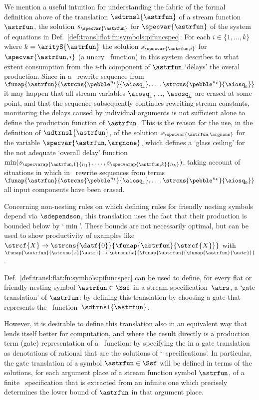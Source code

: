 We mention a useful intuition for understanding the fabric of 
the formal definition above of the translation $\sdtrnsl{\astrfun}$ 
of a stream function $\astrfun$,
the solution $s_{\specvar{\astrfun}}$ for $\specvar{\astrfun}$
of the system of equations in Def.~\ref{def:transl:flat:fn:symbols:pifuncspec}. 
For each $i\in\{1,\ldots,k\}$ where $k = \arityS{\astrfun}$
the solution $s_{\specvar{\astrfun,i}}$ for $\specvar{\astrfun,i}$
(a unary \pein~function) in this system
describes to what extent consumption from the $i$-th component of $\astrfun$
`delays' the overal production.
Since in a \daob~rewrite sequence from
$\funap{\astrfun}{\strcns{\pebble^{n_1}}{\aiosq_1}, \ldots, \strcns{\pebble^{n_k}}{\aiosq_k}}$
it may happen that all stream variables $\aiosq_1$, \ldots, $\aiosq_k$
are erased at some point, and that the sequence subsequently continues rewriting stream constants,
monitoring the delays caused by individual arguments is not sufficient
alone to define the production function of $\astrfun$.
This is the reason for the use, in the definition of $\sdtrnsl{\astrfun}$,
of the solution $s_{\specvar{\astrfun,\argnone}}$ for the variable
$\specvar{\astrfun,\argnone}$, which defines a `glass ceiling' for
the not adequate `overall delay' function
$ \min(
        s_{\specvarap{\astrfun,1}{n_1}},
        \ldots,
        s_{\specvarap{\astrfun,k}{n_k}}
      )
$,
taking account of situations in which in \daob~rewrite sequences
from terms
$\funap{\astrfun}{\strcns{\pebble^{n_1}}{\aiosq_1}, \ldots, \strcns{\pebble^{n_k}}{\aiosq_k}}$
all input components have been erased.

Concerning non-nesting rules on which defining rules for
friendly nesting symbols depend via $\sdependson$,
this translation uses the fact that
their production is bounded below by `$\min$'.
These bounds are not necessarily optimal,
but can be used to show productivity of examples like
$\strcf{X} \to \strcns{\datf{0}}{\funap{\astrfun}{\strcf{X}}}$ with
$\funap{\astrfun}{\strcns{x}{\astr}} \to \strcns{x}{\funap{\astrfun}{\funap{\astrfun}{\astr}}}$.

Def.~\ref{def:transl:flat:fn:symbols:pifuncspec} can be used to define, 
for every flat or friendly nesting symbol $\astrfun\in\Ssf$ 
in a stream specification~$\atrs$, a `gate translation' of $\astrfun$:
by defining this translation by choosing
a gate that represents the \pein~function~$\sdtrnsl{\astrfun}$. 

However, it is desirable to define this translation also in an
equivalent way that lends itself better for computation,
and where the result directly is a production term (gate) representation 
of a \pein~function:
by specifying the  in a gate translation
as denotations of rational  that are
the solutions of `\ioseq\ specifications'. 
In particular, the gate translation of a symbol $\astrfun\in\Ssf$
will be defined in terms of the solutions, 
for each argument place of a stream function symbol $\astrfun$, 
of a finite \ioseq\ specification
that is extracted from an infinite one which precisely
determines the \daob{} lower bound of $\astrfun$ in that argument place.






